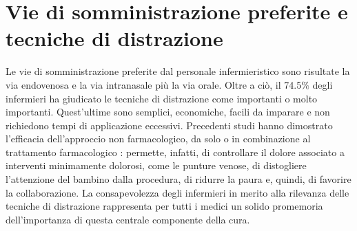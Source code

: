\section{Vie di somministrazione preferite e tecniche di distrazione}
Le vie di somministrazione preferite dal personale infermieristico sono risultate la via endovenosa e la via intranasale più la via orale. Oltre a ciò, il 74.5$\%$ degli infermieri ha giudicato le tecniche di distrazione come importanti o molto importanti. Quest'ultime sono semplici, economiche, facili da imparare e non richiedono tempi di applicazione eccessivi. Precedenti studi hanno dimostrato l'efficacia dell'approccio non farmacologico, da solo o in combinazione al trattamento farmacologico \citep{Tibaldo2020, Koller2012}: permette, infatti, di controllare il dolore associato a interventi minimamente dolorosi, come le punture venose, di distogliere l'attenzione del bambino dalla procedura, di ridurre la paura e, quindi, di favorire la collaborazione. La consapevolezza degli infermieri in merito alla rilevanza delle tecniche di distrazione rappresenta per tutti i medici un solido promemoria dell'importanza di questa centrale componente della cura. 


